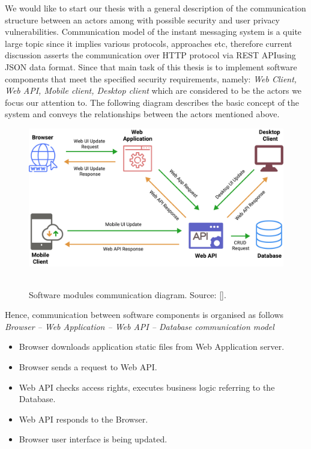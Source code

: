 We would like to start our thesis with a general description of the
communication structure between an actors among with possible security and user privacy vulnerabilities.
Communication model of the instant messaging system is a quite large topic since it implies various protocols, approaches etc,
therefore current discussion asserts the communication over HTTP protocol via REST API\@ using JSON data format.
Since that main task of this thesis is to implement software components that meet the specified security requirements,
namely: \textit{Web Client, Web API, Mobile client, Desktop client} which are
considered to be the actors we focus our attention to.
The following diagram describes the basic concept of the system and conveys the relationships between the
actors mentioned above.

\begin{figure}[H]
    \centering
    \includegraphics[width=1\textwidth]{Pictures/01_Software_modules_communication_diagram}
    ~\caption{Software modules communication diagram. Source: [\cite{mango2021figma}].}\label{fig:figure6}
\end{figure}

Hence, communication between software components is organised as follows\\

\textit{Browser -- Web Application -- Web API -- Database communication model}
\begin{itemize}
    \item Browser downloads application static files from Web Application server.
    \item Browser sends a request to Web API\@.
    \item Web API checks access rights, executes business logic referring to the Database.
    \item Web API responds to the Browser.
    \item Browser user interface is being updated.
\end{itemize}

